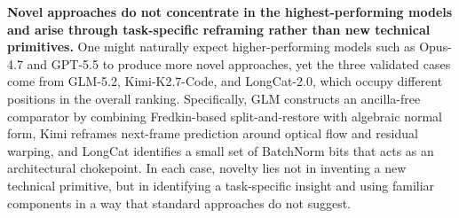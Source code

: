 \textbf{Novel approaches do not concentrate in the highest-performing models and arise through task-specific reframing rather than new technical primitives.}
One might naturally expect higher-performing models such as Opus-4.7 and GPT-5.5 to produce more novel approaches, yet the three validated cases come from GLM-5.2, Kimi-K2.7-Code, and LongCat-2.0, which occupy different positions in the overall ranking.
Specifically, GLM constructs an ancilla-free comparator by combining Fredkin-based split-and-restore with algebraic normal form, Kimi reframes next-frame prediction around optical flow and residual warping, and LongCat identifies a small set of BatchNorm bits that acts as an architectural chokepoint.
In each case, novelty lies not in inventing a new technical primitive, but in identifying a task-specific insight and using familiar components in a way that standard approaches do not suggest.
